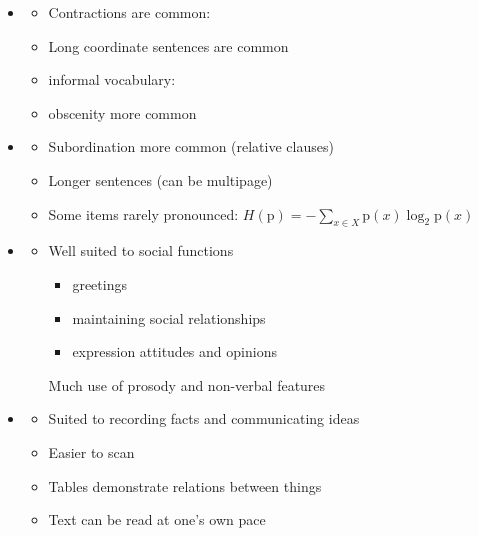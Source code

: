 \documentclass[a4paper,landscape,headrule,footrule,xetex]{foils}
\begin{document}

\begin{itemize}
\item {}

\begin{itemize}
\item Contractions are common: 
\item Long coordinate sentences are common
\item informal vocabulary: 
\item obscenity more common
\end{itemize}
\item {}
\begin{itemize}
\item Subordination more common (relative clauses)
\item Longer sentences (can be multipage)
\item Some items rarely pronounced: \(  H(\mathrm{p}) = -\sum_{x \in X} \mathrm{p}(x)\log_2\mathrm{p}(x) \)
\end{itemize}
\end{itemize}



\begin{itemize}
\item {}

\begin{itemize}
\item Well suited to social functions
  \begin{itemize}
  \item greetings
  \item maintaining social relationships
  \item expression attitudes and opinions
  \end{itemize}
Much use of prosody and non-verbal features
\end{itemize}
\item {}
\begin{itemize}
\item Suited to recording facts and communicating ideas
\item Easier to scan
\item Tables demonstrate relations between things
\item Text can be read at one's own pace
\end{itemize}
\end{itemize}
\end{document}
